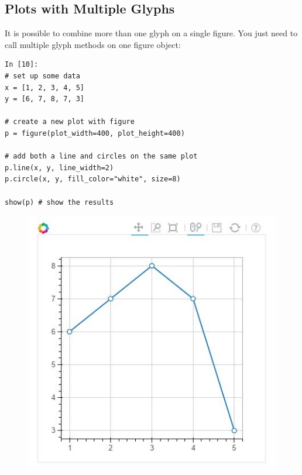 \documentclass[a4paper,12pt]{article}
\begin{document}
\subsection{Plots with Multiple Glyphs}
It is possible to combine more than one glyph on a single figure. You just need to call multiple glyph methods on one figure object:
\begin{framed}
	\begin{verbatim}
In [10]:
# set up some data
x = [1, 2, 3, 4, 5]
y = [6, 7, 8, 7, 3]

# create a new plot with figure
p = figure(plot_width=400, plot_height=400)

# add both a line and circles on the same plot
p.line(x, y, line_width=2)
p.circle(x, y, fill_color="white", size=8)

show(p) # show the results

\end{verbatim}
\end{framed}
\begin{figure}[h!]
\centering
\includegraphics[width=0.7\linewidth]{images/01-BasicPlot-LinePlot-2}
\end{figure}
\end{document}
